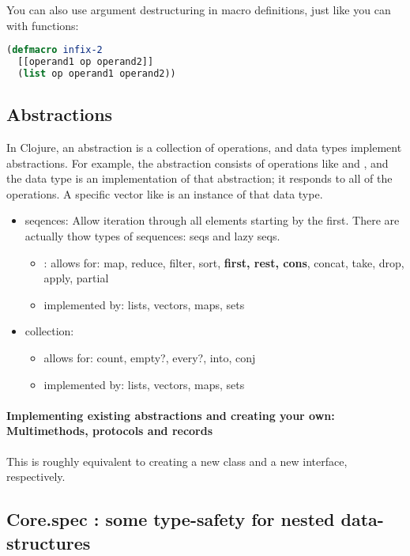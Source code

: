 You can also use argument destructuring in macro definitions, just like you can with functions:
\begin{lstlisting}[language=lisp]
(defmacro infix-2
  [[operand1 op operand2]]
  (list op operand1 operand2))
\end{lstlisting}


\subsection{Abstractions}

In Clojure, an abstraction is a collection of operations, and data types implement abstractions. For example, the  abstraction consists of operations like  and , and the  data type is an implementation of that abstraction; it responds to all of the  operations. A specific vector like  is an instance of that data type.

\begin{itemize}
    \item seqences: Allow iteration through all elements starting by the first. There are actually thow types of sequences: seqs and lazy seqs. 
        \begin{itemize}
            \item: allows for: map, reduce, filter, sort, \textbf{first, rest, cons}, concat, take, drop, apply, partial
            \item implemented by: lists, vectors, maps, sets
        \end{itemize}
    \item collection: 
        \begin{itemize}
            \item allows for: count, empty?, every?, into, conj
            \item implemented by: lists, vectors, maps, sets
        \end{itemize}
\end{itemize}

\paragraph{Implementing existing abstractions and creating your own: Multimethods, protocols and records}
This is roughly equivalent to creating a new class and a new interface, respectively. 


\subsection{Core.spec : some type-safety for nested data-structures}


